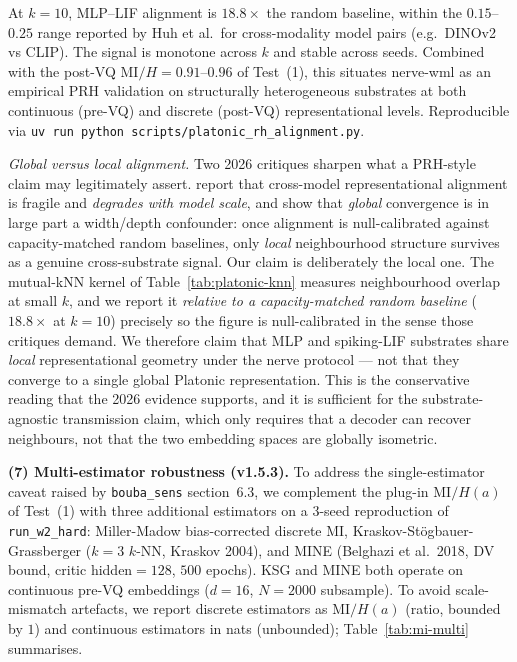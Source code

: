 \documentclass[10pt,twocolumn]{article}
\begin{document}
At $k{=}10$, MLP--LIF alignment is $18.8\times$ the random baseline, within
the $0.15$--$0.25$ range reported by Huh et al.\ for cross-modality model
pairs (e.g.\ DINOv2 vs CLIP). The signal is monotone across $k$ and stable
across seeds. Combined with the post-VQ $\mathrm{MI}/H{=}0.91$--$0.96$ of
Test~(1), this situates nerve-wml as an empirical PRH validation on
structurally heterogeneous substrates at both continuous (pre-VQ) and
discrete (post-VQ) representational levels. Reproducible via
\texttt{uv run python scripts/platonic\_rh\_alignment.py}.

\textit{Global versus local alignment.} Two 2026 critiques sharpen what
a PRH-style claim may legitimately assert.
\cite{platoscave2026} report that cross-model representational
alignment is fragile and \emph{degrades with model scale}, and
\cite{aristotelianprh2026} show that \emph{global} convergence is in
large part a width/depth confounder: once alignment is null-calibrated
against capacity-matched random baselines, only \emph{local}
neighbourhood structure survives as a genuine cross-substrate signal.
Our claim is deliberately the local one. The mutual-kNN kernel of
Table~\ref{tab:platonic-knn} measures neighbourhood overlap at small
$k$, and we report it \emph{relative to a capacity-matched random
baseline} ($18.8\times$ at $k{=}10$) precisely so the figure is
null-calibrated in the sense those critiques demand. We therefore claim
that MLP and spiking-LIF substrates share \emph{local} representational
geometry under the nerve protocol --- not that they converge to a
single global Platonic representation. This is the conservative reading
that the 2026 evidence supports, and it is sufficient for the
substrate-agnostic transmission claim, which only requires that a
decoder can recover neighbours, not that the two embedding spaces are
globally isometric.

\textbf{(7) Multi-estimator robustness (v1.5.3).} To address the
single-estimator caveat raised by \texttt{bouba\_sens} section~6.3,
we complement the plug-in $\mathrm{MI}/H(a)$ of Test~(1) with three
additional estimators on a 3-seed reproduction of
\texttt{run\_w2\_hard}: Miller-Madow bias-corrected discrete MI,
Kraskov-St\"ogbauer-Grassberger ($k{=}3$ $k$-NN, Kraskov 2004), and
MINE (Belghazi et al.\ 2018, DV bound, critic hidden${=}128$,
$500$ epochs). KSG and MINE both operate on continuous pre-VQ
embeddings ($d{=}16$, $N{=}2000$ subsample). To avoid
scale-mismatch artefacts, we report discrete estimators as
$\mathrm{MI}/H(a)$ (ratio, bounded by $1$) and continuous
estimators in nats (unbounded); Table~\ref{tab:mi-multi} summarises.
\end{document}

